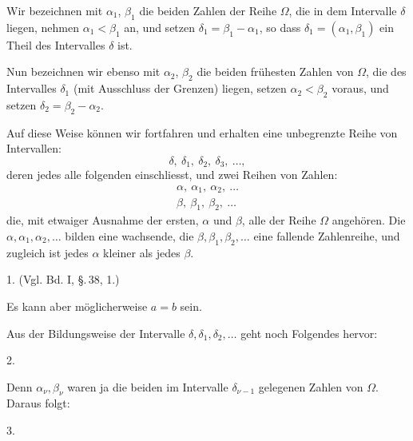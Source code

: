 
Wir bezeichnen mit $\alpha_1$, $\beta_1$ die beiden  Zahlen der Reihe $\Omega$, die in dem Intervalle $\delta$ liegen, nehmen $\alpha_1 < \beta_1$ an, und setzen $\delta_1 = \beta_1 - \alpha_1$, so dass $\delta_1 = (\alpha_1, \beta_1)$ ein Theil des Intervalles $\delta$ ist.

Nun bezeichnen wir ebenso mit $\alpha_2$, $\beta_2$ die beiden fr\"uhesten Zahlen von $\Omega$, die  des Intervalles $\delta_1$ (mit Ausschluss der Grenzen) liegen, setzen $\alpha_2 < \beta_2$ voraus, und setzen $\delta_2 = \beta_2 - \alpha_2$.

Auf diese Weise k\"onnen wir fortfahren und erhalten eine unbegrenzte Reihe von Intervallen:
\[
\delta,\ \delta_1,\ \delta_2,\ \delta_3,\ \dots,
\]
deren jedes alle folgenden einschliesst, und zwei Reihen von Zahlen:
\[
\begin{gathered}
\alpha,\ \alpha_1,\ \alpha_2,\ \dots \\
\beta,\ \beta_1,\ \beta_2,\ \dots
\end{gathered}
\]
die, mit etwaiger Ausnahme der ersten, $\alpha$ und $\beta$, alle der Reihe $\Omega$ angeh\"oren. Die $\alpha, \alpha_1, \alpha_2, \dots$ bilden eine wachsende, die $\beta, \beta_1, \beta_2, \dots$ eine fallende Zahlenreihe, und zugleich ist jedes $\alpha$ kleiner als jedes $\beta$.

1.  (Vgl. Bd. I, \S.\,38, 1.)

Es kann aber m\"oglicherweise $a = b$ sein.

Aus der Bildungsweise der Intervalle $\delta, \delta_1, \delta_2, \dots$ geht noch Folgendes hervor:

2. 

Denn $\alpha_\nu, \beta_\nu$ waren ja die beiden  im Intervalle $\delta_{\nu-1}$ gelegenen Zahlen von $\Omega$. Daraus folgt:

3. 
